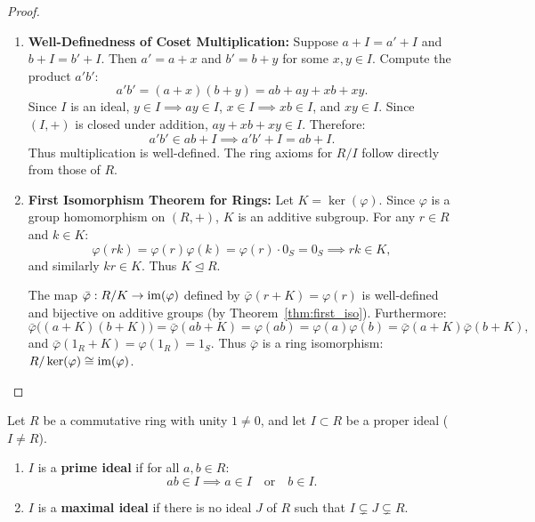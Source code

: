 \begin{proof}
\begin{enumerate}[label=\textbf{(\roman*)}, leftmargin=*, itemsep=8pt]
    \item \textbf{Well-Definedness of Coset Multiplication:}
    Suppose $a + I = a' + I$ and $b + I = b' + I$.
    Then $a' = a + x$ and $b' = b + y$ for some $x, y \in I$.
    Compute the product $a'b'$:
    \begin{equation*}
    a'b' = (a + x)(b + y) = ab + ay + xb + xy.
    \end{equation*}
    Since $I$ is an ideal, $y \in I \implies ay \in I$, $x \in I \implies xb \in I$, and $xy \in I$.
    Since $(I, +)$ is closed under addition, $ay + xb + xy \in I$.
    Therefore:
    \begin{equation*}
    a'b' \in ab + I \implies a'b' + I = ab + I.
    \end{equation*}
    Thus multiplication is well-defined. The ring axioms for $R/I$ follow directly from those of $R$.

    \item \textbf{First Isomorphism Theorem for Rings:}
    Let $K = \ker(\varphi)$.
    Since $\varphi$ is a group homomorphism on $(R, +)$, $K$ is an additive subgroup.
    For any $r \in R$ and $k \in K$:
    \begin{equation*}
    \varphi(rk) = \varphi(r)\varphi(k) = \varphi(r) \cdot 0_S = 0_S \implies rk \in K,
    \end{equation*}
    and similarly $kr \in K$. Thus $K \trianglelefteq R$.
    
    The map $\bar{\varphi}: R/K \to \operatorname{im}(\varphi)$ defined by $\bar{\varphi}(r + K) = \varphi(r)$ is well-defined and bijective on additive groups (by Theorem~\ref{thm:first_iso}).
    Furthermore:
    \begin{equation*}
    \bar{\varphi}\bigl((a+K)(b+K)\bigr) = \bar{\varphi}(ab + K) = \varphi(ab) = \varphi(a)\varphi(b) = \bar{\varphi}(a+K)\bar{\varphi}(b+K),
    \end{equation*}
    and $\bar{\varphi}(1_R + K) = \varphi(1_R) = 1_S$.
    Thus $\bar{\varphi}$ is a ring isomorphism: $R/\ker(\varphi) \cong \operatorname{im}(\varphi)$.
\end{enumerate}
\end{proof}

\begin{definition}
Let $R$ be a commutative ring with unity $1 \ne 0$, and let $I \subset R$ be a proper ideal ($I \ne R$).
\begin{enumerate}[label=\textbf{(\arabic*)}, leftmargin=*, itemsep=4pt]
    \item $I$ is a \textbf{prime ideal} if for all $a, b \in R$:
    \begin{equation}
    ab \in I \implies a \in I \quad \text{or} \quad b \in I.
    \end{equation}
    \item $I$ is a \textbf{maximal ideal} if there is no ideal $J$ of $R$ such that $I \subsetneq J \subsetneq R$.
\end{enumerate}
\end{definition}


